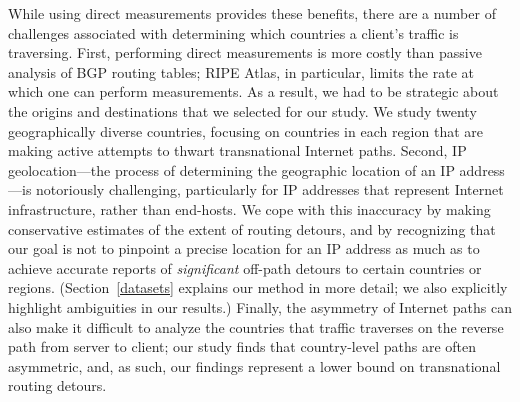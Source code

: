 While using direct measurements provides these benefits, there are a number of 
challenges associated with determining which countries a
client's traffic is traversing.  First,
performing direct measurements is more costly than passive analysis of BGP
routing tables; RIPE Atlas, in particular, limits the rate at which one can
perform measurements.  As a result, we had to be strategic about the origins
and destinations that we selected for our study. We study twenty
geographically diverse countries,  focusing on countries in each region that
are making active attempts to thwart transnational Internet paths.  Second, IP
geolocation---the process of determining the geographic location of an IP
address---is notoriously challenging, particularly for IP addresses that
represent Internet infrastructure, rather than end-hosts. We cope with this
inaccuracy by making conservative estimates of the extent of routing detours,
and by recognizing that our goal is not to pinpoint a precise location for an
IP address as much as to achieve accurate reports of {\em significant} off-path 
detours to certain countries or regions. (Section~\ref{datasets} explains
our method in more detail; we also explicitly highlight ambiguities in our
results.) Finally, the asymmetry of Internet paths can also make it difficult
to analyze the countries that traffic traverses on the reverse path from
server to client; our study finds that country-level paths are often
asymmetric, and, as such, our findings represent a lower bound on
transnational routing detours.

